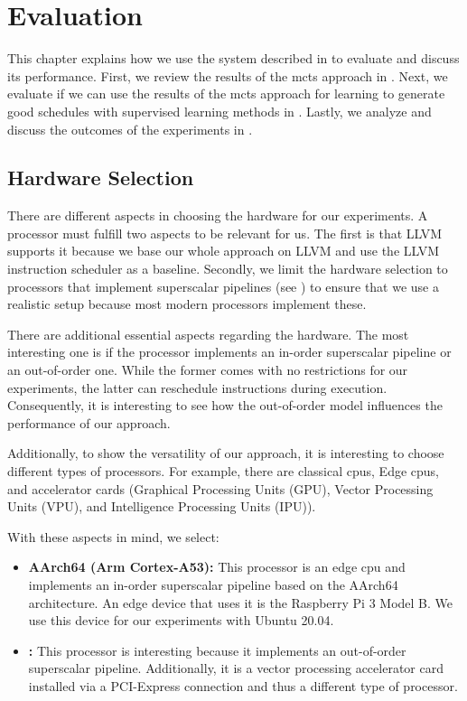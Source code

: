 \chapter{Evaluation}
\label{sec:eval}
This chapter explains how we use the system described in  to evaluate and discuss its performance.
First, we review the results of the \ac{mcts} approach in .
Next, we evaluate if we can use the results of the \ac{mcts} approach for learning to generate good schedules with supervised learning methods in .
Lastly, we analyze and discuss the outcomes of the experiments in .

\section{Hardware Selection}
\label{sec:eval:hw}
There are different aspects in choosing the hardware for our experiments.
A processor must fulfill two aspects to be relevant for us.
The first is that LLVM supports it because we base our whole approach on LLVM and use the LLVM instruction scheduler as a baseline.
Secondly, we limit the hardware selection to processors that implement superscalar pipelines (see ) to ensure that we use a realistic setup because most modern processors implement these.

There are additional essential aspects regarding the hardware.
The most interesting one is if the processor implements an in-order superscalar pipeline or an out-of-order one.
While the former comes with no restrictions for our experiments, the latter can reschedule instructions during execution.
Consequently, it is interesting to see how the out-of-order model influences the performance of our approach.

Additionally, to show the versatility of our approach, it is interesting to choose different types of processors.
For example, there are classical \acp{cpu}, Edge \acp{cpu}, and accelerator cards (\eg Graphical Processing Units (GPU), Vector Processing Units (VPU), and Intelligence Processing Units (IPU)).

With these aspects in mind, we select:
\begin{itemize}
    \item \textbf{AArch64 (Arm Cortex-A53):} This processor is an edge \ac{cpu} and implements an in-order superscalar pipeline based on the AArch64 architecture.
    An edge device that uses it is the Raspberry Pi 3 Model B.
    We use this device for our experiments with Ubuntu 20.04.
    \item \textbf{\auroralong{}:} This processor is interesting because it implements an out-of-order superscalar pipeline. 
    Additionally, it is a vector processing accelerator card installed via a PCI-Express connection and thus a different type of processor.
\end{itemize}

